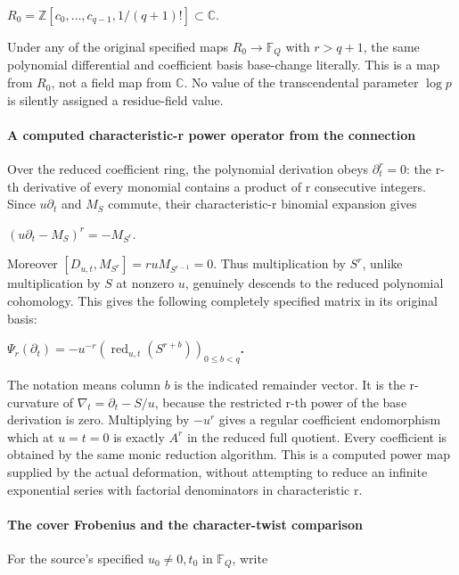 \documentclass{article}
\begin{document}
\(R_0=\mathbb Z[c_0,\ldots,c_{q-1},1/(q+1)!]\subset\mathbb C\).

Under any of the original specified maps \(R_0\to\mathbb F_Q\) with \(r>q+1\), the same polynomial differential and coefficient basis base-change literally. This is a map from \(R_0\), not a field map from \(\mathbb C\). No value of the transcendental parameter \(\log p\) is silently assigned a residue-field value.

\paragraph{A computed characteristic-r power operator from the connection}\label{endpoint-f1_scaling--a-computed-characteristic-r-power-operator-from-the-connection}

Over the reduced coefficient ring, the polynomial derivation obeys \(\partial_t^r=0\): the r-th derivative of every monomial contains a product of r consecutive integers. Since \(u \partial_t\) and \(M_S\) commute, their characteristic-r binomial expansion gives

\((u \partial_t-M_S)^r=-M_{S^r}\).

Moreover \([D_{u,t},M_{S^r}]=r u M_{S^{r-1}}=0\). Thus multiplication by \(S^r\), unlike multiplication by \(S\) at nonzero \(u\), genuinely descends to the reduced polynomial cohomology. This gives the following completely specified matrix in its original basis:

\textbf{\(\Psi_r(\partial_t)=-u^{-r} (\operatorname{red}_{u,t}(S^{r+b}))_{0\le b<q}\).}

The notation means column \(b\) is the indicated remainder vector. It is the r-curvature of \(\nabla_t=\partial_t-S/u\), because the restricted r-th power of the base derivation is zero. Multiplying by \(-u^r\) gives a regular coefficient endomorphism which at \(u=t=0\) is exactly \(A^r\) in the reduced full quotient. Every coefficient is obtained by the same monic reduction algorithm. This is a computed power map supplied by the actual deformation, without attempting to reduce an infinite exponential series with factorial denominators in characteristic r.

\paragraph{The cover Frobenius and the character-twist comparison}\label{endpoint-f1_scaling--the-cover-frobenius-and-the-character-twist-comparison}

For the source's specified \(u_0\ne 0,t_0\) in \(\mathbb F_Q\), write
\end{document}
